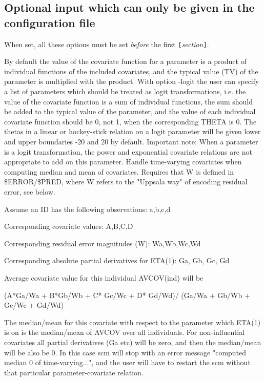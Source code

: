 \subsection{Optional input which can only be given in the configuration file}
When set, all these options must be set \emph{before} the first 
\verb|[|\emph{section}\verb|]|.

\begin{optionlist}
By default the value of the covariate function for a parameter is a  product of individual functions of the included covariates, and the typical value (TV) of the parameter is multiplied with the product. With option -logit the user can specify a list of parameters which should be treated as logit transformations, i.e. the value of the covariate function is a sum of individual functions, the sum should be added to the typical value of the parameter, and the value of each individual covariate function should be 0, not 1, when the corresponding THETA is 0. The thetas in a linear or hockey-stick relation on a logit parameter will be given lower and upper boundaries -20 and 20 by default. Important note: When a parameter is a logit transformation, the power and exponential covariate relations are not appropriate to add on this parameter. 
\nextopt
{}
Handle time-varying covariates when computing median and mean of covariates. Requires that W is defined in \$ERROR/\$PRED,
where W refers to the "Uppsala way" of encoding residual error, see below.

Assume an ID has the following observations: a,b,c,d

Corresponding covariate values: A,B,C,D

Corresponding residual error magnitudes (W): Wa,Wb,Wc,Wd

Corresponding absolute partial derivatives for ETA(1): Ga, Gb, Gc, Gd

Average covariate value for this individual  AVCOV(ind) will be

(A*Ga/Wa + B*Gb/Wb + C* Gc/Wc + D* Gd/Wd)/
(Ga/Wa + Gb/Wb + Gc/Wc + Gd/Wd)

The median/mean for this covariate with respect to the parameter which ETA(1) is on is the median/mean of AVCOV over all individuals.
For non-influential covariates all partial derivatives (Ga etc) will be zero, and then
the median/mean will be also be 0. In this case scm will stop with an error message "computed median 0 of time-varying...",
and the user will have to restart the scm without that particular parameter-covariate relation.


\end{optionlist}
